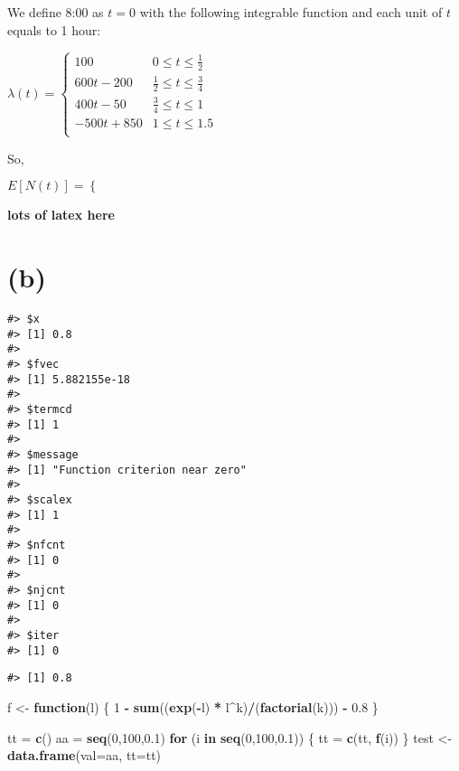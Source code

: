 \documentclass[]{article}
\newenvironment{Shaded}{\begin{snugshade}}{\end{snugshade}}
\newcommand{\ControlFlowTok}[1]{\textcolor[rgb]{0.13,0.29,0.53}{\textbf{#1}}}
\newcommand{\DataTypeTok}[1]{\textcolor[rgb]{0.13,0.29,0.53}{#1}}
\newcommand{\DecValTok}[1]{\textcolor[rgb]{0.00,0.00,0.81}{#1}}
\newcommand{\FloatTok}[1]{\textcolor[rgb]{0.00,0.00,0.81}{#1}}
\newcommand{\KeywordTok}[1]{\textcolor[rgb]{0.13,0.29,0.53}{\textbf{#1}}}
\newcommand{\NormalTok}[1]{#1}
\newcommand{\OperatorTok}[1]{\textcolor[rgb]{0.81,0.36,0.00}{\textbf{#1}}}
\newcommand{\StringTok}[1]{\textcolor[rgb]{0.31,0.60,0.02}{#1}}
\begin{document}
We define 8:00 as \(t=0\) with the following integrable function and
each unit of \(t\) equals to 1 hour:

\(\lambda (t) = \begin{cases} 100 & 0 \leq t \leq \frac{1}{2} \\ 600t - 200 & \frac{1}{2} \leq t \leq \frac{3}{4} \\ 400t - 50 & \frac{3}{4} \leq t \leq 1 \\ -500t + 850 & 1 \leq t \leq 1.5 \\ \end{cases}\)

So,

\(E[N(t)] = \begin{cases} \end{cases}\)

\textbf{lots of latex here}

\hypertarget{b}{%
\section{(b)}\label{b}}

\begin{verbatim}
#> $x
#> [1] 0.8
#> 
#> $fvec
#> [1] 5.882155e-18
#> 
#> $termcd
#> [1] 1
#> 
#> $message
#> [1] "Function criterion near zero"
#> 
#> $scalex
#> [1] 1
#> 
#> $nfcnt
#> [1] 0
#> 
#> $njcnt
#> [1] 0
#> 
#> $iter
#> [1] 0
\end{verbatim}

\begin{verbatim}
#> [1] 0.8
\end{verbatim}

\begin{Shaded}
\begin{Highlighting}[]
\NormalTok{f <-}\StringTok{ }\ControlFlowTok{function}\NormalTok{(l) \{}
    \DecValTok{1} \OperatorTok{-}\StringTok{ }\KeywordTok{sum}\NormalTok{((}\KeywordTok{exp}\NormalTok{(}\OperatorTok{-}\NormalTok{l) }\OperatorTok{*}\StringTok{ }\NormalTok{l}\OperatorTok{^}\NormalTok{k)}\OperatorTok{/}\NormalTok{(}\KeywordTok{factorial}\NormalTok{(k))) }\OperatorTok{-}\StringTok{ }\FloatTok{0.8}
\NormalTok{\}}

\NormalTok{tt =}\StringTok{ }\KeywordTok{c}\NormalTok{()}
\NormalTok{aa =}\StringTok{ }\KeywordTok{seq}\NormalTok{(}\DecValTok{0}\NormalTok{,}\DecValTok{100}\NormalTok{,}\FloatTok{0.1}\NormalTok{)}
\ControlFlowTok{for}\NormalTok{ (i }\ControlFlowTok{in} \KeywordTok{seq}\NormalTok{(}\DecValTok{0}\NormalTok{,}\DecValTok{100}\NormalTok{,}\FloatTok{0.1}\NormalTok{)) \{}
\NormalTok{    tt =}\StringTok{ }\KeywordTok{c}\NormalTok{(tt, }\KeywordTok{f}\NormalTok{(i))}
\NormalTok{\}}
\NormalTok{test <-}\StringTok{ }\KeywordTok{data.frame}\NormalTok{(}\DataTypeTok{val=}\NormalTok{aa, }\DataTypeTok{tt=}\NormalTok{tt)}
\end{Highlighting}
\end{Shaded}
\end{document}
